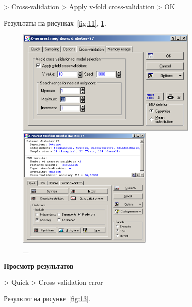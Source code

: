 > Cross-validation > Apply v-fold cross-validation > OK

Результаты на рисунках~\ref{fig:11}, \ref{fig:12}.

\begin{figure}[!h]
  \centering

  \begin{minipage}{0.49\textwidth}
    \centering

    \includegraphics[width=9cm]
    {inc/v5_12.PNG}

    \caption{\_}

    \label{fig:11}
  \end{minipage}
  \begin{minipage}{0.49\textwidth}
    \centering

    \includegraphics[height=6cm]
    {inc/v5_13.PNG}

    \caption{\_}

    \label{fig:12}
  \end{minipage}
\end{figure}

\begin{center}
  \textbf{Просмотр результатов}
\end{center}

> Quick > Cross validation error

Результат на рисунке~\ref{fig:13}.

